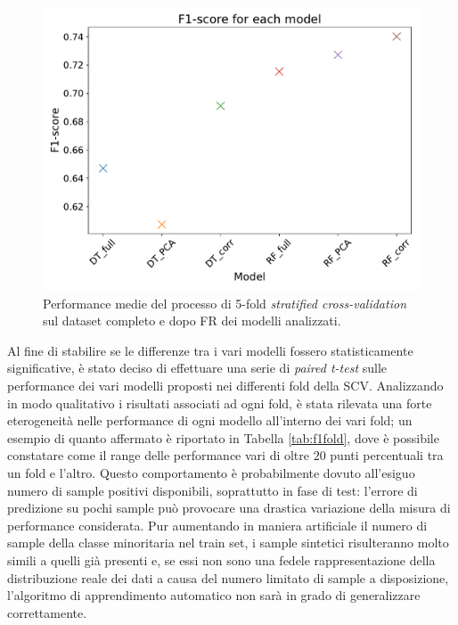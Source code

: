 \begin{figure}
	\centering
	\includegraphics[width=1\linewidth]{images/fscore}
	\caption{Performance medie del processo di 5-fold \textit{stratified cross-validation} sul dataset completo e dopo FR dei modelli analizzati.}
	\label{fig:fscore}
\end{figure}
Al fine di stabilire se le differenze tra i vari modelli fossero statisticamente significative, è stato deciso di effettuare una serie di \textit{paired t-test} sulle performance dei vari modelli proposti nei differenti fold della SCV.
Analizzando in modo qualitativo i risultati associati ad ogni fold, è stata rilevata una forte eterogeneità nelle performance di ogni modello all'interno dei vari fold; un esempio di quanto affermato è riportato in Tabella \ref{tab:f1fold}, dove è possibile constatare come il range delle performance vari di oltre $20$ punti percentuali tra un fold e l'altro.
Questo comportamento è probabilmente dovuto all'esiguo numero di sample positivi disponibili, soprattutto in fase di test: l'errore di predizione su pochi sample può provocare una drastica variazione della misura di performance considerata.
Pur aumentando in maniera artificiale il numero di sample della classe minoritaria nel train set, i sample sintetici risulteranno molto simili a quelli già presenti e, se essi non sono una fedele rappresentazione della distribuzione reale dei dati a causa del numero limitato di sample a disposizione, l'algoritmo di apprendimento automatico non sarà in grado di generalizzare correttamente. 
